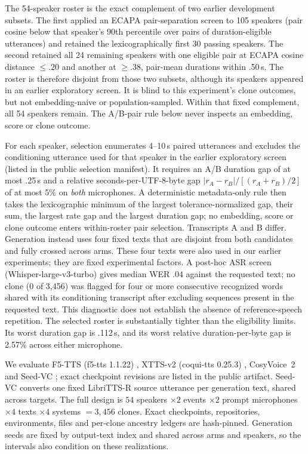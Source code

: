 \documentclass[10pt,twocolumn,letterpaper]{article}
\begin{document}
The 54-speaker roster is the exact complement of two earlier development
subsets. The first applied an ECAPA pair-separation screen to 105 speakers
(pair cosine below that speaker's 90th percentile over pairs of
duration-eligible utterances) and retained the lexicographically first 30
passing speakers. The second retained all 24 remaining speakers with one
eligible pair at ECAPA cosine distance $\leq.20$ and another at $\geq.38$,
pair-mean durations within .50\,s. The roster is therefore disjoint from those
two subsets, although its speakers appeared in an earlier exploratory screen.
It is blind to this experiment's clone outcomes, but not embedding-naive or
population-sampled. Within that fixed complement, all 54
speakers remain. The A/B-pair rule below never inspects an embedding, score or clone outcome.

For each speaker, selection enumerates 4--10\,s paired utterances and excludes
the conditioning utterance used for that speaker in the earlier exploratory
screen (listed in the public selection manifest). It requires an A/B duration
gap of at most .25\,s and a relative seconds-per-UTF-8-byte gap
$|r_A-r_B|/[(r_A+r_B)/2]$ of at most 5\% on \emph{both} microphones. A
deterministic metadata-only rule then takes the lexicographic minimum of the
largest tolerance-normalized gap, their sum, the largest rate gap and the
largest duration gap; no embedding, score or clone outcome enters within-roster
pair selection.
Transcripts A and B differ. Generation instead uses four fixed texts that are
disjoint from both candidates and fully crossed across arms. These four texts
were also used in our earlier experiments; they are fixed experimental factors.
A post-hoc ASR screen (Whisper-large-v3-turbo) gives median WER .04 against
the requested text; no clone (0 of 3,456) was flagged for four or more
consecutive recognized words shared with its conditioning transcript after
excluding sequences present in the requested text. This diagnostic does not
establish the absence of reference-speech repetition. The selected
roster is substantially tighter than the eligibility limits. Its worst duration gap is .112\,s,
and its worst relative duration-per-byte gap is 2.57\% across either microphone.

We evaluate F5-TTS (f5-tts 1.1.22) \cite{f5tts}, XTTS-v2 (coqui-tts 0.25.3)
\cite{xtts}, CosyVoice~2 \cite{cosyvoice2} and Seed-VC \cite{seedvc}; exact
checkpoint revisions are listed in the public artifact. Seed-VC converts one
fixed LibriTTS-R \cite{librittsr} source utterance per generation text, shared
across targets. The full design is
$54$ speakers $\times2$ events $\times2$ prompt microphones $\times4$ texts
$\times4$ systems $=3{,}456$ clones. Exact checkpoints, repositories,
environments, files and per-clone ancestry ledgers are hash-pinned.
Generation seeds are fixed by output-text index and shared across arms and
speakers, so the intervals also condition on these realizations.
\end{document}
